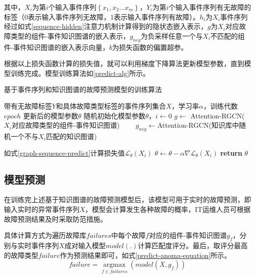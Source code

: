 其中，$X_{i}$为第$i$个输入事件序列$\left\{x_{1}, x_{2} \ldots x_{m}\right\}$，$Y_{i}$为第$i$个输入事件序列有无故障的标签（0表示输入事件序列无故障，1表示输入事件序列有故障）。$h_{i}$为$X_{i}$事件序列经过如式\ref{sequence-hidden}注意力机制计算得到的隐状态嵌入表示，$g$为$X_{i}$对应故障类型的组件-事件知识图谱的嵌入表示，$g_{neg}$为负采样任意一个与$X_{i}$不匹配的组件-事件知识图谱的嵌入表示向量，$b$为损失函数的偏置超参。

根据以上损失函数计算的损失值，就可以利用梯度下降算法更新模型参数，直到模型训练完成。模型训练算法如\ref{predict-alg}所示。

\begin{algorithm}[htbp]
	\renewcommand{\algorithmicrequire}{\textbf{输入:}}
	\renewcommand{\algorithmicensure}{\textbf{输出:}}
	\caption{基于事件序列和知识图谱的故障预测模型的训练算法}
	\label{predict-alg}
	\begin{algorithmic}[1]
		\REQUIRE 带有无故障标签$Y$和具体故障类型标签的事件序列集合$X$，学习率$\alpha$，训练代数$epoch$
		\ENSURE 更新后的模型参数$\theta$
		\STATE 随机初始化模型参数$\theta$，$i \gets 0$
                    \STATE $g \gets$ Attention-RGCN($X_{i}$对应故障类型的组件-事件知识图谱)
                　　\STATE $g_{neg} \gets$Attention-RGCN(知识库中随机一个不与$X_{i}$匹配的知识图谱)

                \ENDIF
                \STATE 如式\ref{graph-sequence-predict}计算损失值$\mathcal{L}_{\theta }\left( X_{i}\right)$
                \STATE $\theta \gets \theta - \alpha \nabla \mathcal{L}_{\theta }\left( X_{i} \right)$
            \ENDFOR
        \ENDWHILE 
		\STATE \textbf{return} $\theta$
	\end{algorithmic}  
\end{algorithm}

\subsection{模型预测}
在训练完上述基于知识图谱的故障预测模型后，该模型可用于实时的故障预测，即输入实时的异常事件序列$X$，模型会计算发生各种故障的概率，IT运维人员可根据故障预测结果及时采取防范措施。

具体计算方式为遍历故障库$failures$中每个故障$f$对应的组件-事件知识图谱$g_f$，分别与实时事件序列$X$成对输入模型$model(.)$计算匹配度评分。最后，取评分最高的故障类型$failure$作为预测结果即可，如式\ref{predict-anoma-equation}所示。
\begin{equation}
    failure = \mathop{\arg\max}\limits_{f\in failures}( model ( X, g_f)) 
    \label{predict-anoma-equation}   
\end{equation}
